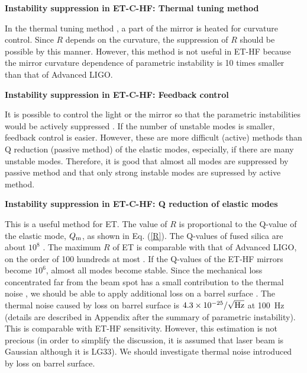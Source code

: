 
\textbf{Instability suppression in ET-C-HF: Thermal tuning method}
\nopagebreak

In the thermal tuning method \cite{Ju2006b}, a part of the mirror is
heated for curvature control. Since $R$ depends on the curvature,
the suppression of $R$ should be possible by this manner. However,
this method is not useful in ET-HF because the mirror curvature dependence of 
parametric instability is 10 times smaller than that of Advanced LIGO. 

\textbf{Instability suppression in ET-C-HF: Feedback control}

It is possible to control the light or the mirror so that the
parametric instabilities would be actively suppressed \cite{Ju2006b,Ju2009}.
If the number of unstable modes is smaller, feedback control is
easier. However, these are more difficult (active) methods than Q
reduction (passive method) of the elastic modes, especially, if
there are many unstable modes. Therefore, it is good that 
almost all modes are suppressed by passive method and that 
only strong instable modes are supressed by active method. 

\textbf{Instability suppression in ET-C-HF: Q reduction of elastic modes}
\nopagebreak



This is a useful method \cite{Gras2006} for ET. The value of
$R$ is proportional to the Q-value of the elastic mode, $Q_{\rm
m}$, as shown in Eq. (\ref{R}). The Q-values of fused silica 
are about $10^8$ \cite{Numata2004}. The
maximum $R$ of ET is comparable with that of Advanced LIGO, on the order of 100
hundreds at most \cite{Ju2006b}. If the Q-values of the ET-HF mirrors become $10^6$, 
almost all modes become stable. Since
the mechanical loss concentrated far from the beam spot has a
small contribution to the thermal noise \cite{Levin1998,Yamamoto2002},
we should be able to apply additional loss on a barrel surface 
\cite{Gras2006,Gras2004}. 
The thermal noise caused by loss on barrel surface is 
$4.3 \times 10^{-25}/\sqrt{\rm Hz}$ at 100~Hz (details are described 
in Appendix after the summary of parametric instability). This is comparable with ET-HF sensitivity. 
However, this estimation is not precious (in order to simplify the discussion, 
it is assumed that laser beam is Gaussian although it is LG33). We should investigate thermal noise 
introduced by loss on barrel surface. 

